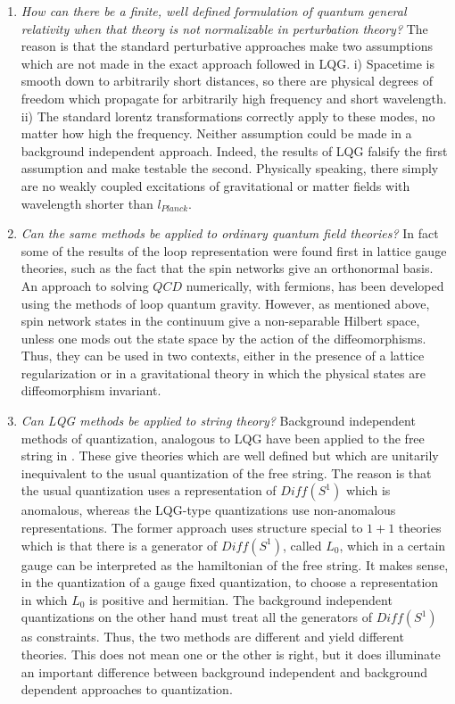 \documentclass[12pt]{article}
\begin{document}
\begin{enumerate}

\item{}{\it How can there be a finite, well defined formulation of quantum general
relativity when that theory is not normalizable in perturbation theory?}  The reason is
that the standard perturbative approaches make two assumptions which are not made
in the exact approach followed in LQG. i)  Spacetime is smooth down to arbitrarily short distances, so there are physical degrees of freedom which propagate for arbitrarily high frequency and short wavelength. ii)  The standard lorentz transformations correctly apply to these modes, no matter how high the frequency. Neither assumption  could be made in a background independent approach. Indeed, the results of LQG falsify the first assumption and make testable the second.  Physically speaking, there simply are no weakly coupled excitations of 
gravitational or matter fields with wavelength shorter than $l_{Planck}$.  

\item{}{\it Can the same methods be applied to ordinary quantum field theories?}
In fact some of the results of the loop representation were found first in 
lattice gauge theories, such as 
the fact that the spin networks give an orthonormal
basis\cite{lattice-old}.  An approach to solving $QCD$ numerically, with
fermions, has been developed using the methods of loop quantum gravity\cite{latticeloop}.
However, as mentioned above, spin network states in the continuum give
a non-separable Hilbert space, unless one mods out the state space by the
action of the diffeomorphisms. Thus, they can be used in two contexts,
either in the presence of a lattice regularization or in a gravitational theory
in which the physical states are diffeomorphism invariant. 

\item{}{\it Can LQG methods be applied to string theory?} Background
independent methods of quantization, analogous to LQG have been
applied to the free string in \cite{artem-string,thomas-string,HP-string}.  These
give theories which are well defined but which are unitarily inequivalent
to the usual quantization of the free string. The reason is that the usual
quantization uses a representation of $Diff(S^1 )$ which is anomalous,
whereas the LQG-type quantizations use non-anomalous representations.
The former approach uses structure special to $1+1$ theories which is that
there is a generator of $Diff(S^1)$, called $L_0$, which in a certain
gauge can be interpreted as the hamiltonian of the free string. It
makes sense, in the quantization of a gauge fixed quantization, to choose
a representation in which $L_0$ is positive and hermitian.  The background
independent quantizations on the other hand must treat all the generators
of $Diff(S^1 )$ as constraints.  Thus, the two methods are different
and yield different theories. This does not mean one or the other is right,
but it does illuminate an important difference between background
independent and background dependent approaches to quantization. 


\end{enumerate}
\end{document}
